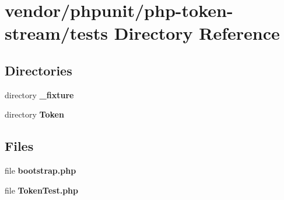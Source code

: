 \section{vendor/phpunit/php-\/token-\/stream/tests Directory Reference}
\label{dir_da0bf99b1379099624da3f21f9fe5a0b}
\subsection*{Directories}
\begin{DoxyCompactItemize}
\item 
directory {\bf \+\_\+fixture}
\item 
directory {\bf Token}
\end{DoxyCompactItemize}
\subsection*{Files}
\begin{DoxyCompactItemize}
\item 
file {\bf bootstrap.\+php}
\item 
file {\bf Token\+Test.\+php}
\end{DoxyCompactItemize}
